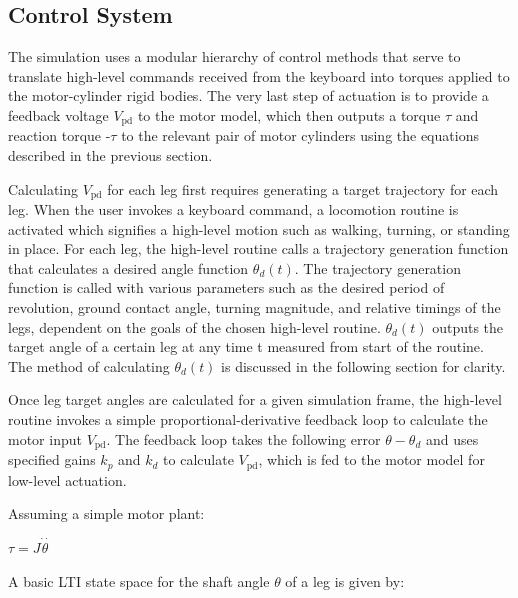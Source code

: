 \documentclass[11pt]{article}
\begin{document}
\subsection{Control System}

The simulation uses a modular hierarchy of control methods that serve to translate high-level commands received from the keyboard into torques applied to the motor-cylinder rigid bodies. The very last step of actuation is to provide a feedback voltage \(V_{\text{pd}}\) to the motor model, which then outputs a torque $\tau$ and reaction torque -$\tau$ to the relevant pair of motor cylinders using the equations described in the previous section.

Calculating \(V_{\text{pd}}\) for each leg first requires generating a target trajectory for each leg. When the user invokes a keyboard command, a locomotion routine is activated which signifies a high-level motion such as walking, turning, or standing in place. For each leg, the high-level routine calls a trajectory generation function that calculates a desired angle function \(\theta _d(t)\). The trajectory generation function is called with various parameters such as the desired period of revolution, ground contact angle, turning magnitude, and relative timings of the legs, dependent on the goals of the chosen high-level routine. \(\theta _d(t)\) outputs the target angle of a certain leg at any time t measured from start of the routine. The method of calculating \(\theta _d(t)\) is discussed in the following section for clarity.

Once leg target angles are calculated for a given simulation frame, the high-level routine invokes a simple proportional-derivative feedback loop to calculate the motor input \(V_{\text{pd}}\). The feedback loop takes the following error \(\theta -\theta _d\) and uses specified gains \(k_p\) and \(k_d\) to calculate \(V_{\text{pd}}\), which is fed to the motor model for low-level actuation.

Assuming a simple motor plant:

\begin{center}
\(\tau =J \overset{\cdot \cdot }{\theta }\)
\end{center}

A basic LTI state space for the shaft angle $\theta $ of a leg is given by:
\end{document}
